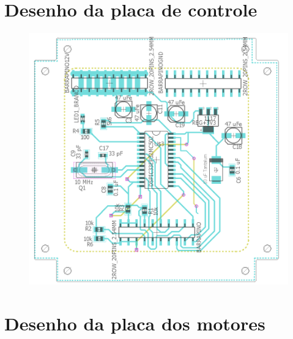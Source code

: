 \documentclass[
	12pt,				%
	openany,			%
	twoside,			%
	a4paper,			%
	english,			%
	french,				%
	spanish,			%
	brazil,				%
	oldfontcommands
	]{abntex2}
\begin{document}
\begin{apendicesenv}
\partapendices

\chapter{Desenho da placa de controle}

\begin{figure}[th]
	\centering
	\includegraphics[width=1\linewidth]{./figs/Placa_master}
\end{figure}

\label{ap:PMaster}

\chapter{Desenho da placa dos motores}


\end{apendicesenv}
\end{document}
